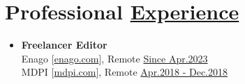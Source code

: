 
\section{Professional \href{.}{Experience}}

\begin{itemize}




    \item {\bf Freelancer Editor}\\
          Enago [\href{https://www.enago.com/}{enago.com}], Remote \hfill
          \href{.}{Since Apr.2023}\\
          MDPI [\href{https://www.mdpi.com/}{mdpi.com}], Remote \hfill
          \href{.}{Apr.2018 - Dec.2018}


\end{itemize}
